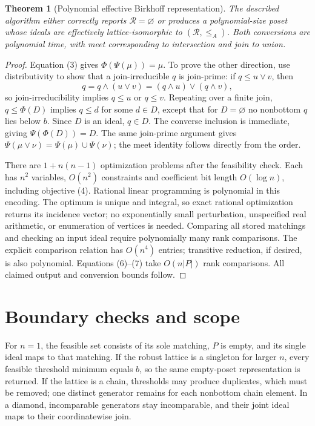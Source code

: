 \documentclass[11pt,a4paper]{article}
\newtheorem{theorem}{Theorem}[section]
\begin{document}
\begin{theorem}[Polynomial effective Birkhoff representation]
The described algorithm either correctly reports $\mathcal R=\varnothing$ or produces a polynomial-size poset whose ideals are effectively lattice-isomorphic to $(\mathcal R,\le_A)$. Both conversions are polynomial time, with meet corresponding to intersection and join to union.
\end{theorem}
\begin{proof}
Equation (3) gives $\Phi(\Psi(\mu))=\mu$. To prove the other direction, use distributivity to show that a join-irreducible $q$ is join-prime: if $q\le u\vee v$, then
\[
 q=q\wedge(u\vee v)=(q\wedge u)\vee(q\wedge v),
\]
so join-irreducibility implies $q\le u$ or $q\le v$. Repeating over a finite join, $q\le\Phi(D)$ implies $q\le d$ for some $d\in D$, except that for $D=\varnothing$ no nonbottom $q$ lies below $b$. Since $D$ is an ideal, $q\in D$. The converse inclusion is immediate, giving $\Psi(\Phi(D))=D$. The same join-prime argument gives $\Psi(\mu\vee\nu)=\Psi(\mu)\cup\Psi(\nu)$; the meet identity follows directly from the order.

There are $1+n(n-1)$ optimization problems after the feasibility check. Each has $n^2$ variables, $O(n^2)$ constraints and coefficient bit length $O(\log n)$, including objective (4). Rational linear programming is polynomial in this encoding. The optimum is unique and integral, so exact rational optimization returns its incidence vector; no exponentially small perturbation, unspecified real arithmetic, or enumeration of vertices is needed. Comparing all stored matchings and checking an input ideal require polynomially many rank comparisons. The explicit comparison relation has $O(n^4)$ entries; transitive reduction, if desired, is also polynomial. Equations (6)--(7) take $O(n|P|)$ rank comparisons. All claimed output and conversion bounds follow.
\end{proof}

\section{Boundary checks and scope}
For $n=1$, the feasible set consists of its sole matching, $P$ is empty, and its single ideal maps to that matching. If the robust lattice is a singleton for larger $n$, every feasible threshold minimum equals $b$, so the same empty-poset representation is returned. If the lattice is a chain, thresholds may produce duplicates, which must be removed; one distinct generator remains for each nonbottom chain element. In a diamond, incomparable generators stay incomparable, and their joint ideal maps to their coordinatewise join.
\end{document}
